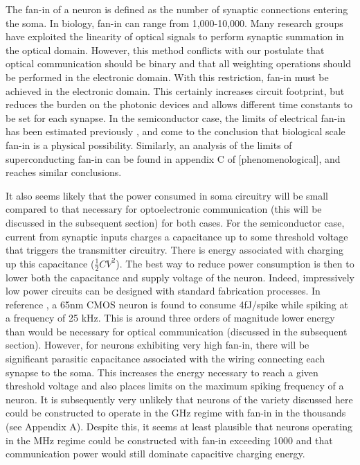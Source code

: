 \documentclass{article}
\begin{document}
The fan-in of a neuron is defined as the number of synaptic connections entering the soma. In biology, fan-in can range from 1,000-10,000. Many research groups have exploited the linearity of optical signals to perform synaptic summation in the optical domain. However, this method conflicts with our postulate that optical communication should be binary and that all weighting operations should be performed in the electronic domain. With this restriction, fan-in must be achieved in the electronic domain. This certainly increases circuit footprint, but reduces the burden on the photonic devices and allows different time constants to be set for each synapse. In the semiconductor case, the limits of electrical fan-in has been estimated previously \cite{akima2014majority, dowrick2018fan}, and come to the conclusion that biological scale fan-in is a physical possibility. Similarly, an analysis of the limits of superconducting fan-in can be found in appendix C of [phenomenological], and reaches similar conclusions.

It also seems likely that the power consumed in soma circuitry will be small compared to that necessary for optoelectronic communication (this will be discussed in the subsequent section) for both cases. For the semiconductor case, current from synaptic inputs charges a capacitance up to some threshold voltage that triggers the transmitter circuitry. There is energy associated with charging up this capacitance ($\frac{1}{2}CV^2$). The best way to reduce power consumption is then to lower both the capacitance and supply voltage of the neuron. Indeed, impressively low power circuits can be designed with standard fabrication processes. In reference \cite{sourikopoulos20174}, a 65nm CMOS neuron is found to consume 4fJ/spike while spiking at a frequency of 25 kHz. This is around three orders of magnitude lower energy than would be necessary for optical communication (discussed in the subsequent section). However, for neurons exhibiting very high fan-in, there will be significant parasitic capacitance associated with the wiring connecting each synapse to the soma. This increases the energy necessary to reach a given threshold voltage and also places limits on the maximum spiking frequency of a neuron. It is subsequently very unlikely that neurons of the variety discussed here could be constructed to operate in the GHz regime with fan-in in the thousands (see Appendix A). Despite this, it seems at least plausible that neurons operating in the MHz regime could be constructed with fan-in exceeding 1000 and that communication power would still dominate capacitive charging energy.
\end{document}
